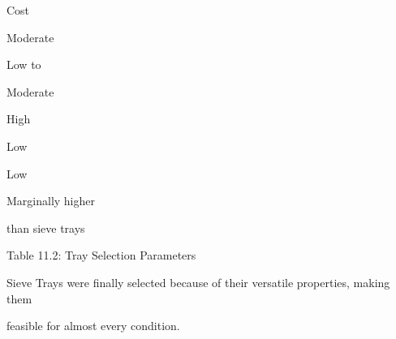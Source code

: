 \documentclass[a4paper,portrait,12pt]{article}
\begin{document}
\begin{flushleft}
Cost
\end{flushleft}





\begin{flushleft}
Moderate
\end{flushleft}





\begin{flushleft}
Low to
\end{flushleft}


\begin{flushleft}
Moderate
\end{flushleft}





\begin{flushleft}
High
\end{flushleft}





\begin{flushleft}
Low
\end{flushleft}





\begin{flushleft}
Low
\end{flushleft}





\begin{flushleft}
Marginally higher
\end{flushleft}


\begin{flushleft}
than sieve trays
\end{flushleft}





\begin{flushleft}
Table 11.2: Tray Selection Parameters
\end{flushleft}





\begin{flushleft}
Sieve Trays were finally selected because of their versatile properties, making them
\end{flushleft}


\begin{flushleft}
feasible for almost every condition.
\end{flushleft}
\end{document}
